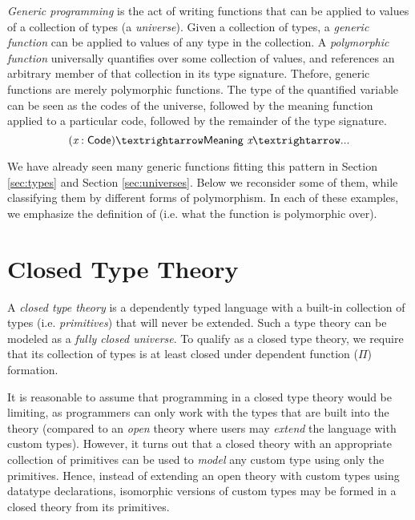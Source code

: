 \documentclass[12pt]{report}
\newcommand{\refsec}[1]{Section \ref{sec:#1}}
\newcommand{\AgdaFun}[1]{\AgdaFunction{#1}}
\newcommand{\AgdaVar}[1]{\AgdaBound{#1}}
\theoremstyle{definition}
\theoremstyle{remark}
\numberwithin{definition}{section}
\numberwithin{equation}{section}
\numberwithin{proposition}{section}
\numberwithin{conjecture}{section}
\numberwithin{theorem}{section}
\numberwithin{lemma}{section}
\numberwithin{corollary}{section}
\numberwithin{example}{section}
\numberwithin{remark}{section}
\begin{document}
\textit{Generic programming} is the act of writing
functions that can be applied to values of a collection of types
(a \textit{universe}).
Given a collection of types, a \textit{generic function} can be
applied to values of any type in the collection. A
\textit{polymorphic function} universally
quantifies over some collection of values, and references an arbitrary
member of that collection in its type signature. Thefore, generic
functions are merely polymorphic functions.
The type of the quantified variable can be seen as the codes of the
universe, followed by the meaning function applied to a particular
code, followed by the remainder of the type signature.
$$
(\AgdaVar{x} : \AgdaFun{Code}) → \AgdaFun{Meaning}~\AgdaVar{x} → ...
$$

We have already seen many generic functions fitting this pattern in
\refsec{types} and \refsec{universes}. Below we reconsider some of
them, while classifying them by different forms of polymorphism. In
each of these examples, we emphasize the definition of
\AgdaFun{Code} (i.e. what the function is polymorphic over).






\chapter{Closed Type Theory}\label{ch:closedtt}

A \textit{closed type theory} is a dependently typed language with a
built-in collection of types
(i.e. \textit{primitives}) that will never be extended.
Such a type
theory can be modeled as a \textit{fully closed universe}. To qualify
as a closed type theory, we require that its collection of types is at
least closed under dependent function ($\Pi$) formation.

It is reasonable to assume that programming in a closed type theory
would be limiting, as programmers can only work with the types that
are built into the theory (compared to an \textit{open} theory where
users may \textit{extend} the language with custom types).
However, it turns out that a closed theory with an appropriate
collection of primitives can be used to \textit{model} any custom type
using only the primitives. Hence, instead of extending an open theory
with custom types using datatype declarations,
isomorphic versions of custom types
may be formed in a closed theory from its primitives.
\end{document}
